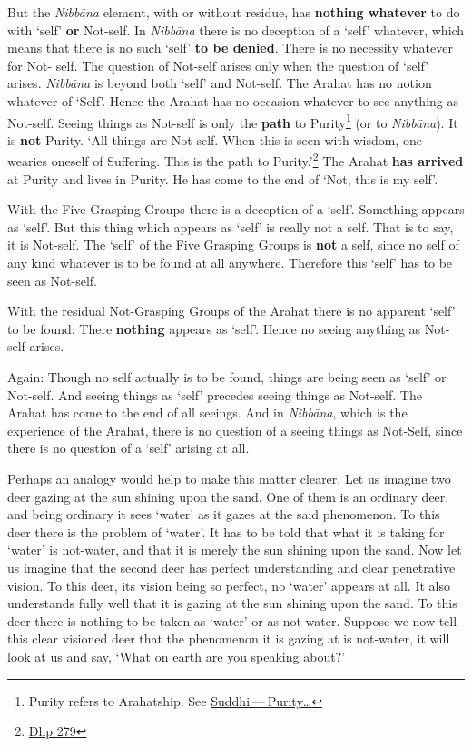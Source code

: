 But the \emph{Nibbāna} element, with or without residue, has \textbf{nothing whatever} to do with `self' \textbf{or} Not-self. In \emph{Nibbāna} there is no deception of a `self' whatever, which means that there is no such `self' \textbf{to be denied}. There is no necessity whatever for Not- self. The question of Not-self arises only when the question of `self' arises. \emph{Nibbāna} is beyond both `self' and Not-self. The Arahat has no notion whatever of `Self'. Hence the Arahat has no occasion whatever to see anything as Not-self. Seeing things as Not-self is only the \textbf{path} to Purity\footnote{Purity refers to Arahatship. See \protect\hyperlink{suddhi}{Suddhi --- Purity\ldots\hspace{0pt}}} (or to \emph{Nibbāna}). It is \textbf{not} Purity. `All things are Not-self. When this is seen with wisdom, one wearies oneself of Suffering. This is the path to Purity.'\footnote{\href{https://suttacentral.net/dhp273-289/en/anandajoti}{Dhp 279}} The Arahat \textbf{has arrived} at Purity and lives in Purity. He has come to the end of `Not, this is my self'.

With the Five Grasping Groups there is a deception of a `self'. Something appears as `self'. But this thing which appears as `self' is really not a self. That is to say, it is Not-self. The `self' of the Five Grasping Groups is \textbf{not} a self, since no self of any kind whatever is to be found at all anywhere. Therefore this `self' has to be seen as Not-self.

With the residual Not-Grasping Groups of the Arahat there is no apparent `self' to be found. There \textbf{nothing} appears as `self'. Hence no seeing anything as Not-self arises.

Again: Though no self actually is to be found, things are being seen as `self' or Not-self. And seeing things as `self' precedes seeing things as Not-self. The Arahat has come to the end of all seeings. And in \emph{Nibbāna}, which is the experience of the Arahat, there is no question of a seeing things as Not-Self, since there is no question of a `self' arising at all.

Perhaps an analogy would help to make this matter clearer. Let us imagine two deer gazing at the sun shining upon the sand. One of them is an ordinary deer, and being ordinary it sees `water' as it gazes at the said phenomenon. To this deer there is the problem of `water'. It has to be told that what it is taking for `water' is not-water, and that it is merely the sun shining upon the sand. Now let us imagine that the second deer has perfect understanding and clear penetrative vision. To this deer, its vision being so perfect, no `water' appears at all. It also understands fully well that it is gazing at the sun shining upon the sand. To this deer there is nothing to be taken as `water' or as not-water. Suppose we now tell this clear visioned deer that the phenomenon it is gazing at is not-water, it will look at us and say, `What on earth are you speaking about?'

